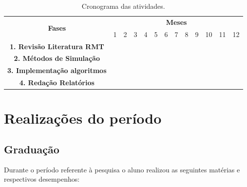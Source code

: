 \documentclass[12pt]{report}
\begin{document}
\begin{table}[ht]
	\centering
	\begin{tabular}{|c|c|c|c|c|c|c|c|c|c|c|c|c|}
		\hline
		\multirow{2}{*}{{\bf Fases}} & \multicolumn{12}{c|}{{\bf Meses}}
		\\ \cline{2-13}
		& 1 & 2 & 3 & 4 & 5 & 6 & 7 & 8 & 9 & 10 & 11 & 12
		\\ \hline
		{\bf 1. Revisão Literatura RMT} & \checkmark & \checkmark & \checkmark & \checkmark & \checkmark & & & & & & &
		\\ \hline
		{\bf 2. Métodos de Simulação} &  &  &  & \checkmark & \checkmark & \checkmark & \checkmark & \checkmark & & & &
		\\ \hline
		{\bf 3. Implementação algoritmos} & & & & & \checkmark & \checkmark & \checkmark & \checkmark & \checkmark & \checkmark & \checkmark &
		\\ \hline
		{\bf 4. Redação Relatórios} & & & & \checkmark & \checkmark & & & & & & \checkmark & \checkmark 
		\\ \hline
	\end{tabular}
	\caption{Cronograma das atividades.}
	\label{tab:cronograma1ano}
\end{table}

\chapter{Realizações do período}\label{chp:realizacoes}

\section{Graduação}

Durante o período referente à pesquisa o aluno realizou as seguintes matérias e respectivos desempenhos:
\hspace{1cm}
\end{document}
